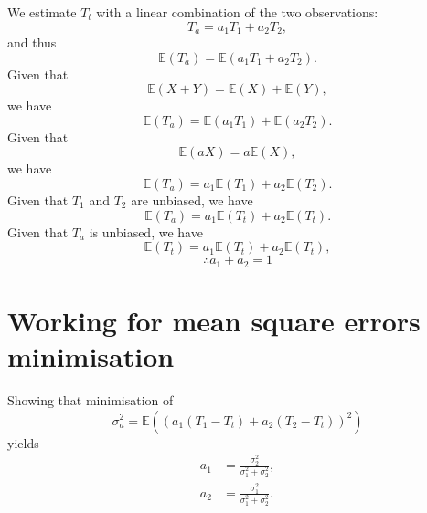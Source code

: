 We estimate $T_t$ with a linear combination of the two observations:
\begin{equation*}
    T_a = a_1 T_1 + a_2 T_2,
\end{equation*}
and thus
\begin{equation*}
    \mathbb{E}(T_a) = \mathbb{E}(a_1 T_1 + a_2 T_2).
\end{equation*}
Given that
\begin{equation*}
    \mathbb{E}(X + Y) = \mathbb{E}(X) + \mathbb{E}(Y),
\end{equation*}
we have
\begin{equation*}
    \mathbb{E}(T_a) = \mathbb{E}(a_1 T_1) + \mathbb{E}(a_2 T_2).
\end{equation*}
Given that
\begin{equation*}
    \mathbb{E}(aX) = a \mathbb{E}(X),
\end{equation*}
we have
\begin{equation*}
    \mathbb{E}(T_a) = a_1 \mathbb{E}(T_1) + a_2 \mathbb{E}(T_2).
\end{equation*}
Given that $T_1$ and $T_2$ are unbiased, we have
\begin{equation*}
    \mathbb{E}(T_a) = a_1 \mathbb{E}(T_t) + a_2 \mathbb{E}(T_t).
\end{equation*}
Given that $T_a$ is unbiased, we have
\begin{equation*}
    \mathbb{E}(T_t) = a_1 \mathbb{E}(T_t) + a_2 \mathbb{E}(T_t),
\end{equation*}
\begin{equation}
    \therefore a_1 + a_2 = 1 \label{eq:coeff_constraints}
\end{equation}

\section{Working for mean square errors minimisation}
\label{sec:kalnay_working:mse}

Showing that minimisation of 
\begin{equation}
\sigma_a^2 = \mathbb{E} \left( \left( a_1(T_1 - T_t) + a_2(T_2 - T_t) \right)^2 \right)
\end{equation}
yields
\begin{subequations}
    \begin{align}
    a_1 &= \frac{\sigma_2^2}{\sigma_1^2 + \sigma_2^2}, \\
    a_2 &= \frac{\sigma_1^2}{\sigma_1^2 + \sigma_2^2}.
    \end{align}
\end{subequations}        

